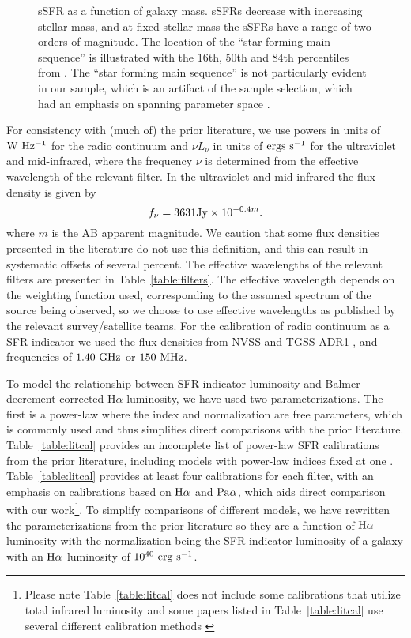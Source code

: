 \documentclass[preprint]{aastex61}
\begin{document}
\begin{figure}
\caption{sSFR as a function of galaxy mass. sSFRs decrease with increasing stellar mass, and at fixed stellar mass the sSFRs have a range of two orders of magnitude. The location of the ``star forming main sequence'' is illustrated with the 16th, 50th and 84th percentiles from \citet{elb11}. The ``star forming main sequence'' is not particularly evident in our sample, which is an artifact of the sample selection, which had an emphasis on spanning parameter space \citep{mou06,mou10}.}
\label{fig:ssfr}
\end{figure}

For consistency with (much of) the prior literature, we use powers in units of ${\rm W~Hz^{-1}}$ for the radio continuum and $\nu L_\nu$ in units of ${\rm ergs~s^{-1}}$ for the ultraviolet and mid-infrared, where the frequency $\nu$ is determined from the effective wavelength of the relevant filter. In the ultraviolet and mid-infrared the flux density is given by 
\begin{equation}
f_\nu = 3631 {\rm Jy} \times 10^{-0.4 m}.
\end{equation}
where $m$ is the AB apparent magnitude. We caution that some flux densities presented in the literature do not use this definition, and this can result in systematic offsets of several percent. The effective wavelengths of the relevant filters are presented in Table~\ref{table:filters}. The effective wavelength depends on the weighting function used, corresponding to the assumed spectrum of the source being observed, so we choose to use effective wavelengths as published by the relevant survey/satellite teams. For the calibration of radio continuum as a SFR indicator we used the flux densities from NVSS and TGSS ADR1 \citep{con98,con02,int16}, and frequencies of $1.40~{\rm GHz}$ or $150~{\rm MHz}$. 

To model the relationship between SFR indicator luminosity and Balmer decrement corrected H$\alpha$ luminosity, we have used two parameterizations. The first is a power-law where the index and normalization are free parameters, which is commonly used and thus simplifies direct comparisons with the prior literature. Table~\ref{table:litcal} provides an incomplete list of power-law SFR calibrations from the prior literature, including models with power-law indices fixed at one \citep[e.g.,][]{ken09}. Table~\ref{table:litcal} provides at least four calibrations for each filter, with an emphasis on calibrations based on ${\rm H\alpha}$ and ${\rm Pa \alpha}$, which aids direct comparison with our work\footnote{Please note Table~\ref{table:litcal} does not include some calibrations that utilize total infrared luminosity \citep[e.g.,][]{got11,ruj13} and some papers listed in Table~\ref{table:litcal} use several different calibration methods \citep[e.g.,][]{rie09,dav16}}. To simplify comparisons of different models, we have rewritten the parameterizations from the prior literature so they are a function of ${\rm H\alpha}$ luminosity with the normalization being the SFR indicator luminosity of a galaxy with an ${\rm H\alpha}$ luminosity of $10^{40}~{\rm erg~s^{-1}}$.
\end{document}
